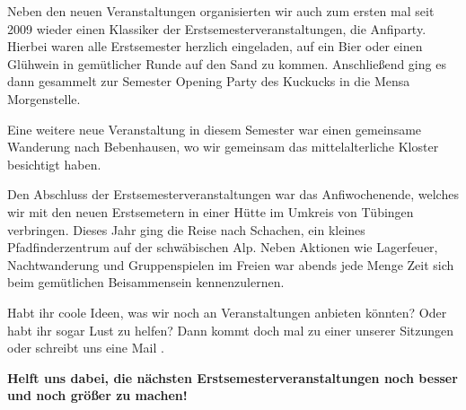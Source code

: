 Neben den neuen Veranstaltungen organisierten wir auch zum ersten mal seit 2009 wieder einen Klassiker der Erstsemesterveranstaltungen, die Anfiparty. Hierbei waren alle Erstsemester herzlich eingeladen, auf ein Bier oder einen Glühwein in gemütlicher Runde auf den Sand zu kommen. Anschließend ging es dann gesammelt zur Semester Opening Party des Kuckucks in die Mensa Morgenstelle.

Eine weitere neue Veranstaltung in diesem Semester war einen gemeinsame Wanderung nach Bebenhausen, wo wir gemeinsam das mittelalterliche Kloster besichtigt haben.

Den Abschluss der Erstsemesterveranstaltungen war das Anfiwochenende, welches wir mit den neuen Erstsemetern in einer Hütte im Umkreis von Tübingen verbringen.
Dieses Jahr ging die Reise nach Schachen, ein kleines Pfadfinderzentrum auf der schwäbischen Alp. Neben Aktionen wie Lagerfeuer, Nachtwanderung und Gruppenspielen im Freien war abends jede Menge Zeit sich beim gemütlichen Beisammensein kennenzulernen. 

Habt ihr coole Ideen, was wir noch an Veranstaltungen anbieten könnten? Oder habt ihr sogar Lust zu helfen? Dann kommt doch mal zu einer unserer Sitzungen
oder schreibt uns eine Mail
.

\textbf{Helft uns dabei, die nächsten Erstsemesterveranstaltungen noch besser und noch größer zu machen!}

